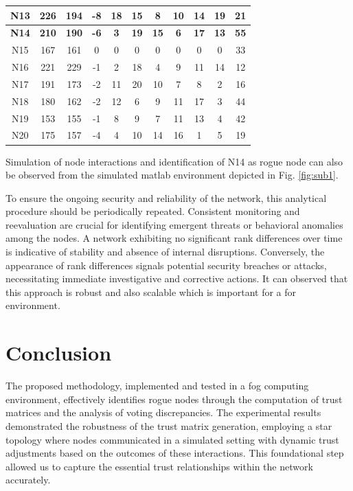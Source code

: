 \documentclass{sn-jnl}%
\begin{document}
\begin{itemize}
\begin{table}[htbp]
{\begin{tabular}{|c|c|c|c|c|c|c|c|c|c|c|}
\hline
N13 & 226 & 194 & -8 & 18 & 15 & 8 & 10 & 14 & 19 & 21 \\
\hline
\textbf{N14} & \textbf{210} & \textbf{190} & \textbf{-6} & \textbf{3} & \textbf{19} & \textbf{15} & \textbf{6} & \textbf{17} & \textbf{13} & \textbf{55} \\
\hline
N15 & 167 & 161 & 0 & 0 & 0 & 0 & 0 & 0 & 0 & 33 \\
\hline
N16 & 221 & 229 & -1 & 2 & 18 & 4 & 9 & 11 & 14 & 12 \\
\hline
N17 & 191 & 173 & -2 & 11 & 20 & 10 & 7 & 8 & 2 & 16 \\
\hline
N18 & 180 & 162 & -2 & 12 & 6 & 9 & 11 & 17 & 3 & 44 \\
\hline
N19 & 153 & 155 & -1 & 8 & 9 & 7 & 11 & 13 & 4 & 42 \\
\hline
N20 & 175 & 157 & -4 & 4 & 10 & 14 & 16 & 1 & 5 & 19 \\
\hline
\end{tabular}
}
\end{table}
Simulation of node interactions and identification of N14 as rogue node can also be observed from the simulated matlab environment depicted in Fig. \ref{fig:sub1}.




To ensure the ongoing security and reliability of the network, this analytical procedure should be periodically repeated. Consistent monitoring and reevaluation are crucial for identifying emergent threats or behavioral anomalies among the nodes. A network exhibiting no significant rank differences over time is indicative of stability and absence of internal disruptions. Conversely, the appearance of rank differences signals potential security breaches or attacks, necessitating immediate investigative and corrective actions. It can observed that this approach is robust and also scalable which is important for a for environment.

 
\end{itemize}

\section{Conclusion}

The proposed methodology, implemented and tested in a fog computing environment, effectively identifies rogue nodes through the computation of trust matrices and the analysis of voting discrepancies. The experimental results demonstrated the robustness of the trust matrix generation, employing a star topology where nodes communicated in a simulated setting with dynamic trust adjustments based on the outcomes of these interactions. This foundational step allowed us to capture the essential trust relationships within the network accurately.
\end{document}
